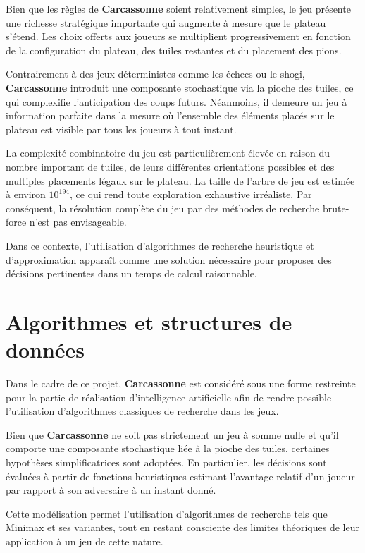 \documentclass[11pt]{article}
\begin{document}
Bien que les règles de \textbf{Carcassonne} soient relativement simples, le jeu présente une richesse stratégique importante qui augmente à mesure que le plateau s’étend. 
Les choix offerts aux joueurs se multiplient progressivement en fonction de la configuration du plateau, des tuiles restantes et du placement des pions.

Contrairement à des jeux déterministes comme les échecs ou le shogi, \textbf{Carcassonne} introduit une composante stochastique via la pioche des tuiles, ce qui complexifie l’anticipation des coups futurs. 
Néanmoins, il demeure un jeu à information parfaite dans la mesure où l’ensemble des éléments placés sur le plateau est visible par tous les joueurs à tout instant.

La complexité combinatoire du jeu est particulièrement élevée en raison du nombre important de tuiles, de leurs différentes orientations possibles et des multiples placements légaux sur le plateau. 
La taille de l’arbre de jeu est estimée à environ $10^{194}$\cite{heyden2009implementing}, ce qui rend toute exploration exhaustive irréaliste.
Par conséquent, la résolution complète du jeu par des méthodes de recherche brute-force n’est pas envisageable.

Dans ce contexte, l’utilisation d’algorithmes de recherche heuristique et d’approximation apparaît comme
une solution nécessaire pour proposer des décisions pertinentes dans un temps de calcul raisonnable.




\section{Algorithmes et structures de données}

Dans le cadre de ce projet, \textbf{Carcassonne} est considéré sous une forme restreinte pour la partie de réalisation d'intelligence artificielle afin de rendre possible l’utilisation d’algorithmes classiques de recherche dans les jeux.

Bien que \textbf{Carcassonne} ne soit pas strictement un jeu à somme nulle et qu’il comporte une composante stochastique liée à la pioche des tuiles, certaines hypothèses simplificatrices sont adoptées.
En particulier, les décisions sont évaluées à partir de fonctions heuristiques estimant l’avantage relatif d’un joueur par rapport à son adversaire à un instant donné.

Cette modélisation permet l’utilisation d’algorithmes de recherche tels que Minimax et ses variantes, tout en restant consciente des limites théoriques de leur application à un jeu de cette nature.
\end{document}
